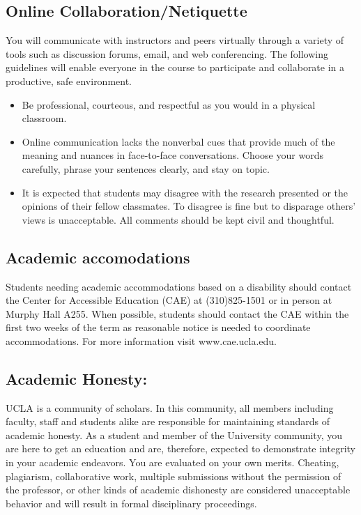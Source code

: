 \documentclass[11pt,]{article}
\providecommand{\tightlist}{%
  \setlength{\itemsep}{0pt}\setlength{\parskip}{0pt}}
\begin{document}
\subsection{Online
Collaboration/Netiquette}\label{online-collaborationnetiquette}

You will communicate with instructors and peers virtually through a
variety of tools such as discussion forums, email, and web conferencing.
The following guidelines will enable everyone in the course to
participate and collaborate in a productive, safe environment.

\begin{itemize}
\tightlist
\item
  Be professional, courteous, and respectful as you would in a physical
  classroom.
\item
  Online communication lacks the nonverbal cues that provide much of the
  meaning and nuances in face-to-face conversations. Choose your words
  carefully, phrase your sentences clearly, and stay on topic.
\item
  It is expected that students may disagree with the research presented
  or the opinions of their fellow classmates. To disagree is fine but to
  disparage others' views is unacceptable. All comments should be kept
  civil and thoughtful.
\end{itemize}

\subsection{Academic accomodations}\label{academic-accomodations}

Students needing academic accommodations based on a disability should
contact the Center for Accessible Education (CAE) at (310)825-1501 or in
person at Murphy Hall A255. When possible, students should contact the
CAE within the first two weeks of the term as reasonable notice is
needed to coordinate accommodations. For more information visit
www.cae.ucla.edu.

\subsection{Academic Honesty:}\label{academic-honesty}

UCLA is a community of scholars. In this community, all members
including faculty, staff and students alike are responsible for
maintaining standards of academic honesty. As a student and member of
the University community, you are here to get an education and are,
therefore, expected to demonstrate integrity in your academic endeavors.
You are evaluated on your own merits. Cheating, plagiarism,
collaborative work, multiple submissions without the permission of the
professor, or other kinds of academic dishonesty are considered
unacceptable behavior and will result in formal disciplinary
proceedings.
\end{document}
